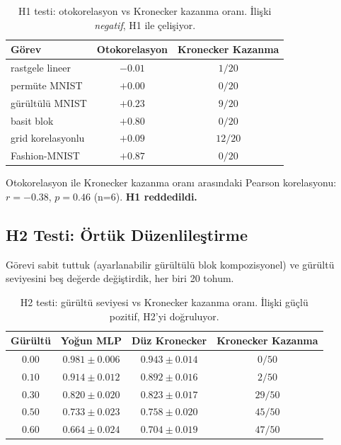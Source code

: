 \documentclass[11pt,a4paper]{article}
\begin{document}
\begin{table}[h]
\centering
\caption{H1 testi: otokorelasyon vs Kronecker kazanma oranı.
İlişki \emph{negatif}, H1 ile çelişiyor.}
\label{tab:h1}
\small
\begin{tabular}{lcc}
\toprule
Görev & Otokorelasyon & Kronecker Kazanma \\
\midrule
rastgele lineer   & $-0.01$ & $1/20$ \\
permüte MNIST     & $+0.00$ & $0/20$ \\
gürültülü MNIST   & $+0.23$ & $9/20$ \\
basit blok        & $+0.80$ & $0/20$ \\
grid korelasyonlu & $+0.09$ & $12/20$ \\
Fashion-MNIST     & $+0.87$ & $0/20$ \\
\bottomrule
\end{tabular}
\end{table}

Otokorelasyon ile Kronecker kazanma oranı arasındaki Pearson
korelasyonu: $r = -0.38$, $p = 0.46$ (n=6). \textbf{H1
reddedildi.}


\subsection{H2 Testi: Örtük Düzenlileştirme}
\label{sec:h2}

Görevi sabit tuttuk (ayarlanabilir gürültülü blok kompozisyonel)
ve gürültü seviyesini beş değerde değiştirdik, her biri 20 tohum.

\begin{table}[h]
\centering
\caption{H2 testi: gürültü seviyesi vs Kronecker kazanma oranı.
İlişki güçlü pozitif, H2'yi doğruluyor.}
\label{tab:h2}
\small
\begin{tabular}{cccc}
\toprule
Gürültü & Yoğun MLP & Düz Kronecker & Kronecker Kazanma \\
\midrule
$0.00$ & $0.981 \pm 0.006$ & $0.943 \pm 0.014$ & $0/50$ \\
$0.10$ & $0.914 \pm 0.012$ & $0.892 \pm 0.016$ & $2/50$ \\
$0.30$ & $0.820 \pm 0.020$ & $0.823 \pm 0.017$ & $29/50$ \\
$0.50$ & $0.733 \pm 0.023$ & $0.758 \pm 0.020$ & $45/50$ \\
$0.60$ & $0.664 \pm 0.024$ & $0.704 \pm 0.019$ & $47/50$ \\
\bottomrule
\end{tabular}
\end{table}
\end{document}
